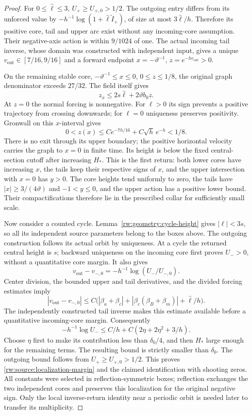 \begin{proof}
For $0\le\widehat\ell\le3$, $U_+\ge U_{+,0}>1/2$. The outgoing
entry differs from its unforced value by
$-h^{-1}\log(1+\widehat\ell\widetilde I_+)$, of size at most
$3\widehat\ell/h$. Therefore its positive core, tail and upper arc exist
without any incoming-core assumption. Their negative-axis action is
within $9/1024$ of one. The actual incoming tail inverse, whose domain
was constructed with independent input, gives a unique
$v_{\mathrm{out}}\in[7/16,9/16]$ and a forward endpoint
$x=-\vartheta^{-1}$, $z=e^{-hv_{\mathrm{out}}}>0$.

On the remaining stable core, $-\vartheta^{-1}\le x\le0$,
$0\le z\le1/8$, the original graph denominator exceeds $27/32$.
The field itself gives
\[
 z_x\le2s\widehat\ell+2\vartheta b_0z.
\]
At $z=0$ the normal forcing is nonnegative. For $\ell>0$ its sign
prevents a positive trajectory from crossing downwards; for $\ell=0$
uniqueness preserves positivity. Gronwall on this $x$-interval
gives
\[
 0<z(x)\le C e^{-7h/16}+C\sqrt h\,e^{-h}<1/8.
\]
There is no exit through its upper boundary; the positive horizontal
velocity carries the graph to $x=0$ in finite time. Its height is
below the fixed central-section cutoff after increasing $H_*$.
This is the first return: both lower cores have increasing $x$, the
tails keep their respective signs of $x$, and the upper intersection
with $x=0$ has $y>0$. The core heights tend uniformly to zero,
the tails have $|x|\ge3/(4\vartheta)$ and $-1<y\le0$, and the
upper action has a positive lower bound. Their compactifications
therefore lie in the prescribed collar for sufficiently small scale.

Now consider a counted cycle. Lemma~\ref{rw:geometry:cycle-height}
gives $|\ell|<3s$, so all its independent source parameters belong
to the boxes above. The outgoing construction follows its actual
orbit by uniqueness. At a cycle the returned central height is $s$;
backward uniqueness on the incoming core first proves $U_->0$,
without a quantitative core margin. It also gives
\[
 v_{\mathrm{out}}-v_{-,0}
                  =-h^{-1}\log(U_-/U_{-,0}).
\]
Center division, the bounded upper and tail derivatives, and the
divided forcing estimates imply
\[
 |v_{\mathrm{out}}-v_{-,0}|
 \le C\bigl(|\beta_a+\beta_c|
          +|\beta_c(\beta_B+\beta_m)|+\widehat\ell/h\bigr).
\]
The independently constructed tail inverse makes this estimate
available before a quantitative incoming-core margin. Consequently
\[
 -h^{-1}\log U_-\le C/h+C(2\eta+2\eta^2+3/h).
\]
Choose $\eta$ first to make its contribution less than
$\delta_0/4$, and then $H_*$ large enough for the remaining terms.
The resulting bound is strictly smaller than $\delta_0$.
The outgoing bound follows from $U_+\ge U_{+,0}>1/2$.
This proves \eqref{rw:source:localization-margin} and the claimed
identification with shooting zeros. All constants were selected in
reflection-symmetric boxes; reflection exchanges the two independent
cores and preserves this localization for the original negative sign.
Only the local inverse-return identity near a periodic orbit is needed
later to transfer its multiplicity.
\end{proof}
